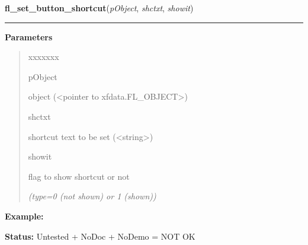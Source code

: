 \hspace{.8\funcindent}\begin{boxedminipage}{\funcwidth}

    \raggedright \textbf{fl\_set\_button\_shortcut}(\textit{pObject}, \textit{shctxt}, \textit{showit})

    \vspace{-1.5ex}

    \rule{\textwidth}{0.5\fboxrule}
\setlength{\parskip}{2ex}
\setlength{\parskip}{1ex}
      \textbf{Parameters}
      \vspace{-1ex}

      \begin{quote}
        \begin{Ventry}{xxxxxxx}

          \item[pObject]

          object ({\textless}pointer to xfdata.FL\_OBJECT{\textgreater})

          \item[shctxt]

          shortcut text to be set ({\textless}string{\textgreater})

          \item[showit]

          flag to show shortcut or not

            {\it (type=0 (not shown) or 1 (shown))}

        \end{Ventry}

      \end{quote}

\textbf{Example:} 

\textbf{Status:} Untested + NoDoc + NoDemo = NOT OK



    \end{boxedminipage}

    \label{xformslib:library:fl_create_generic_button}

    \vspace{0.5ex}

